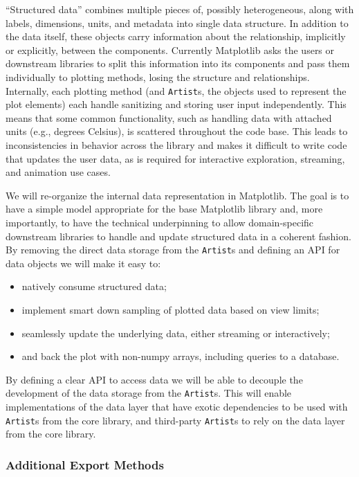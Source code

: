 \documentclass[11pt]{article}  %
\begin{document}
``Structured data'' combines multiple pieces of, possibly
heterogeneous, along with labels, dimensions, units, and metadata into
single data structure.
In addition to the data itself, these objects carry information about
the relationship, implicitly or explicitly, between the components.
Currently Matplotlib asks the users or downstream libraries to split
this information into its components and pass them individually to
plotting methods, losing the structure and relationships.
Internally, each plotting method (and \texttt{Artist}s, the objects
used to represent the plot elements) each handle sanitizing and
storing user input independently.
This means that some common functionality, such as handling data with
attached units (e.g., degrees Celsius), is scattered throughout the
code base.
This leads to inconsistencies in behavior across the library and makes
it difficult to write code that updates the user data, as is required
for interactive exploration, streaming, and animation use cases.


We will re-organize the internal data representation in Matplotlib.  The
goal is to have a simple model appropriate for the base Matplotlib
library and, more importantly, to have the technical underpinning to
allow domain-specific downstream libraries to handle and update
structured data in a coherent fashion.
By removing the direct data storage from the \texttt{Artist}s and
defining an API for data objects we will make it easy to:
\begin{itemize}
  \item natively consume structured data;
  \item implement smart down sampling of plotted data based on view
    limits;
  \item seamlessly update the underlying data, either
    streaming or interactively;
  \item and back the plot with non-numpy arrays, including queries to
    a database.
\end{itemize}
By defining a clear API to access data we will be able to decouple
the development of the data storage from the \texttt{Artist}s.
This will enable implementations of the data layer that have exotic
dependencies to be used with \texttt{Artist}s from the core library,
and third-party \texttt{Artist}s to rely on the data layer from the
core library.



\subsubsection{Additional Export Methods}
\end{document}
